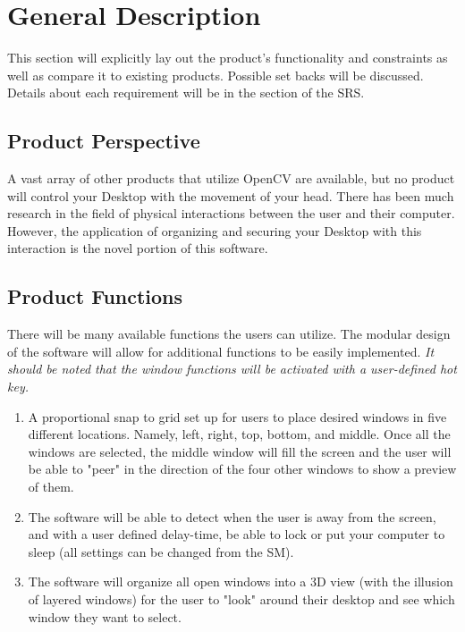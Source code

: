 \documentclass[titlepage]{article}
\begin{document}
\section{General Description}
This section will explicitly lay out the product's functionality and constraints as well as compare it to existing products. Possible set backs will be discussed. Details about each requirement will be in the  section of the SRS. 
 

\subsection{Product Perspective}
A vast array of other products that utilize OpenCV are available, but no product will control your Desktop with the movement of your head. There has been much research in the field of physical interactions between the user and their computer. However, the application of organizing and securing your Desktop with this interaction is the novel portion of this software.

\subsection{Product Functions}
There will be many available functions the users can utilize. The modular design of the software will allow for additional functions to be easily implemented. \textit{It should be noted that the window functions will be activated with a user-defined hot key.}
\begin{enumerate}
	\item A proportional snap to grid set up for users to place desired windows in five different locations. Namely, left, right, top, bottom, and middle. Once all the windows are selected, the middle window will fill the screen and the user will be able to "peer" in the direction of the four other windows to show a preview of them.
	\item The software will be able to detect when the user is away from the screen, and with a user defined delay-time, be able to lock or put your computer to sleep (all settings can be changed from the SM). 
	\item The software will organize all open windows into a 3D view (with the illusion of layered windows) for the user to "look" around their desktop and see which window they want to select.
\end{enumerate}
\end{document}
